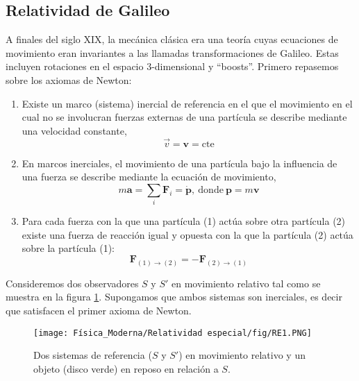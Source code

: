\documentclass[../main]{subfiles}
\begin{document}
        \begin{adjustwidth}{0pt}{-100pt}
          
        \section{Relatividad de Galileo}\label{sec:galileo}   
        
            A finales del siglo XIX, la mecánica clásica era una teoría cuyas ecuaciones de movimiento eran invariantes a las llamadas transformaciones de Galileo. Estas incluyen rotaciones en el espacio 3-dimensional y ``boosts''. Primero repasemos sobre los axiomas de Newton:
            \begin{enumerate}
                \item Existe un marco (sistema) inercial de referencia en el que el movimiento en el cual no se involucran fuerzas externas de una partícula se describe mediante una velocidad constante,
                \begin{equation}
                    \vec{v}=\mathbf{v}=\mathrm{cte}
                \end{equation}
                \item En marcos inerciales, el movimiento de una partícula bajo la influencia de una fuerza se describe mediante la ecuación de movimiento,
                \begin{equation}
                    m \mathbf{a}=\sum_i \mathbf{F}_i=\dot{\mathbf{p}}, \ \mathrm{donde} \ \mathbf{p}=m\mathbf{v}
                \end{equation}
                \item Para cada fuerza con la que una partícula (1) actúa sobre otra partícula (2) existe una fuerza de reacción igual y opuesta con la que la partícula (2) actúa sobre la partícula (1):
                \begin{equation}
                    \mathbf{F}_{(1)\rightarrow (2)}=-\mathbf{F}_{(2)\rightarrow (1)}
                \end{equation}
            \end{enumerate}
        
            Consideremos dos observadores $S$ y $S'$ en movimiento relativo tal como se muestra en la figura \ref{fig:fig1}. Supongamos que ambos sistemas son inerciales, es decir que satisfacen el primer axioma de Newton.

            \begin{figure}[H]
            \begin{adjustwidth}{0pt}{-100pt}
                \centering
                \texttt{[image: Física\_Moderna/Relatividad especial/fig/RE1.PNG]}
                \caption{Dos sistemas de referencia ($S$ y $S'$) en movimiento relativo y un objeto (disco verde) en reposo en relación a $S$.}
                \label{fig:fig1}
            \end{adjustwidth}
            \end{figure}


\end{adjustwidth}
\end{document}
